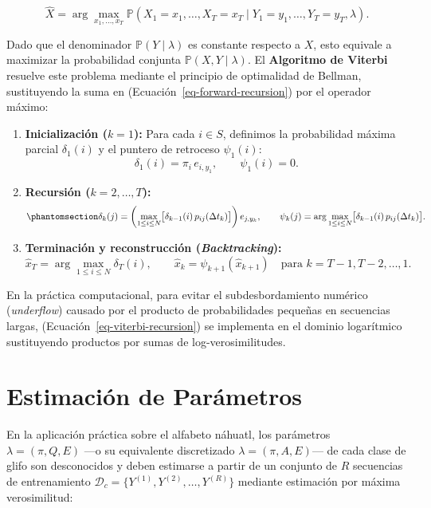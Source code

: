 \documentclass[
  spanish,
  us-letterpaper,
]{scrreprt}
\providecommand{\tightlist}{%
  \setlength{\itemsep}{0pt}\setlength{\parskip}{0pt}}
\theoremstyle{definition}
\theoremstyle{remark}
\begin{document}
\[
\hat{X} = \arg\max_{x_1, \dots, x_T} \mathbb{P}(X_1 = x_1, \dots, X_T = x_T \mid Y_1 = y_1, \dots, Y_T = y_T, \lambda).
\]

Dado que el denominador \(\mathbb{P}(Y \mid \lambda)\) es constante
respecto a \(X\), esto equivale a maximizar la probabilidad conjunta
\(\mathbb{P}(X, Y \mid \lambda)\). El \textbf{Algoritmo de Viterbi}
resuelve este problema mediante el principio de optimalidad de Bellman,
sustituyendo la suma en (Ecuación~\ref{eq-forward-recursion}) por el
operador máximo:

\begin{enumerate}
\def\labelenumi{\arabic{enumi}.}
\tightlist
\item
  \textbf{Inicialización (\(k = 1\)):} Para cada \(i \in S\), definimos
  la probabilidad máxima parcial \(\delta_1(i)\) y el puntero de
  retroceso \(\psi_1(i)\): \[
  \delta_1(i) = \pi_i \, e_{i, y_1}, \qquad \psi_1(i) = 0.
  \]
\item
  \textbf{Recursión (\(k = 2, \dots, T\)):}
  \begin{equation}\phantomsection\label{eq-viterbi-recursion}{
  \delta_k(j) = \left(\max_{1 \le i \le N} \bigl[\delta_{k-1}(i)\, p_{ij}(\Delta t_k)\bigr]\right) e_{j, y_k}, \qquad \psi_k(j) = \arg\max_{1 \le i \le N} \bigl[\delta_{k-1}(i)\, p_{ij}(\Delta t_k)\bigr].
  }\end{equation}
\item
  \textbf{Terminación y reconstrucción (\emph{Backtracking}):} \[
  \hat{x}_T = \arg\max_{1 \le i \le N} \delta_T(i), \qquad \hat{x}_k = \psi_{k+1}(\hat{x}_{k+1}) \quad \text{para } k = T-1, T-2, \dots, 1.
  \]
\end{enumerate}

En la práctica computacional, para evitar el subdesbordamiento numérico
(\emph{underflow}) causado por el producto de probabilidades pequeñas en
secuencias largas, (Ecuación~\ref{eq-viterbi-recursion}) se implementa
en el dominio logarítmico sustituyendo productos por sumas de
log-verosimilitudes.

\section{Estimación de Parámetros}\label{estimaciuxf3n-de-paruxe1metros}

En la aplicación práctica sobre el alfabeto náhuatl, los parámetros
\(\lambda = (\pi, Q, E)\) ---o su equivalente discretizado
\(\lambda = (\pi, A, E)\)--- de cada clase de glifo son desconocidos y
deben estimarse a partir de un conjunto de \(R\) secuencias de
entrenamiento \(\mathcal{D}_c = \{Y^{(1)}, Y^{(2)}, \dots, Y^{(R)}\}\)
mediante estimación por máxima verosimilitud:
\end{document}
